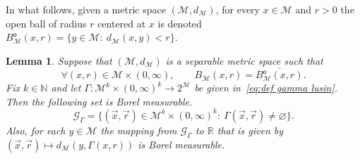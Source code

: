 \documentclass[11pt,reqno]{amsart}
\newcommand{\R}{\mathbb R}
\newtheorem{lemma}[theorem]{Lemma}
\theoremstyle{remark}
\newcommand{\MM}{\mathcal{M}}
\newcommand{\N}{\mathbb N}
\renewcommand{\emptyset}{\varnothing}
\renewcommand{\1}{\mathbf 1}
\newcommand{\cG}{\mathscr{G}}
\begin{document}
In what follows, given a metric space $(\MM, d_\MM)$, for every $x\in \MM$ and $r>0$ the open ball of radius $r$ centered at $x$ is denoted $B^{\mathsf{o}}_\MM(x,r)=\{y\in \MM:\ d_\MM(x,y)<r\}$.

\begin{lemma}\label{lem:open dense} Suppose that $(\MM,d_\MM)$ is a separable metric space such that
\begin{equation}\label{eq:ball assumption}
\forall (x,r)\in \MM\times (0,\infty),\qquad B_\MM(x,r)=\overline{B_\MM^{\mathsf{o}}(x,r)}.
\end{equation} Fix $k\in \N$ and let $\Gamma:{\MM}^k\times (0,\infty)^k\to 2^{\MM}$ be given in~\eqref{eq:def gamma lusin}. Then the following  set is Borel measurable.
$$\cG_\Gamma=\big\{(\vec{x},\vec{r})\in \MM^k\times (0,\infty)^k:\ \Gamma(\vec{x},\vec{r})\neq\emptyset\big\}.$$
Also, for each $y\in \MM$ the mapping from $\cG_\Gamma$ to $\R$ that is given by $(\vec{x},\vec{r})\mapsto d_\MM(y,\Gamma(x,r))$ is  Borel measurable.
\end{lemma}
\end{document}

